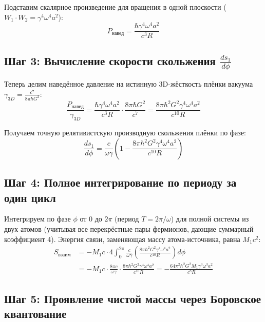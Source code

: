 \documentclass[12pt,a4paper]{article}
\begin{document}
Подставим скалярное произведение для вращения в одной плоскости ($W_1 \cdot W_2 = \gamma^4 \omega^4 a^2$):
\begin{equation}
P_{навед} = \frac{\hbar \gamma^4 \omega^4 a^2}{c^3 R}
\end{equation}

\subsection*{Шаг 3: Вычисление скорости скольжения $\frac{ds_1}{d\phi}$}

Теперь делим наведённое давление на истинную 3D-жёсткость плёнки вакуума $\gamma_{3D} = \frac{c^7}{8\pi \hbar G^2}$:
\begin{equation}
\frac{P_{навед}}{\gamma_{3D}} = \frac{\hbar \gamma^4 \omega^4 a^2}{c^3 R} \cdot \frac{8\pi \hbar G^2}{c^7} = \frac{8\pi \hbar^2 G^2 \gamma^4 \omega^4 a^2}{c^{10} R}
\end{equation}

Получаем точную релятивистскую производную скольжения плёнки по фазе:
\begin{equation}
\frac{ds_1}{d\phi} = \frac{c}{\omega \gamma} \left( 1 - \frac{8\pi \hbar^2 G^2 \gamma^4 \omega^4 a^2}{c^{10} R} \right)
\end{equation}

\subsection*{Шаг 4: Полное интегрирование по периоду за один цикл}

Интегрируем по фазе $\phi$ от $0$ до $2\pi$ (период $T = 2\pi/\omega$) для полной системы из двух атомов (учитывая все перекрёстные пары фермионов, дающие суммарный коэффициент 4). Энергия связи, заменяющая массу атома-источника, равна $M_1 c^2$:
\begin{align}
S_{взаим} &= - M_1 c \cdot 4 \int_0^{2\pi} \frac{c}{\omega \gamma} \left( \frac{8\pi \hbar^2 G^2 \gamma^4 \omega^4 a^2}{c^{10} R} \right) d\phi \\
&= - M_1 c \cdot \frac{8\pi c}{\omega \gamma} \cdot \frac{8\pi \hbar^2 G^2 \gamma^4 \omega^4 a^2}{c^{10} R} = - \frac{64 \pi^2 \hbar^2 G^2 M_1 \gamma^3 \omega^3 a^2}{c^8 R}
\end{align}

\subsection*{Шаг 5: Проявление чистой массы через Боровское квантование}
\end{document}
